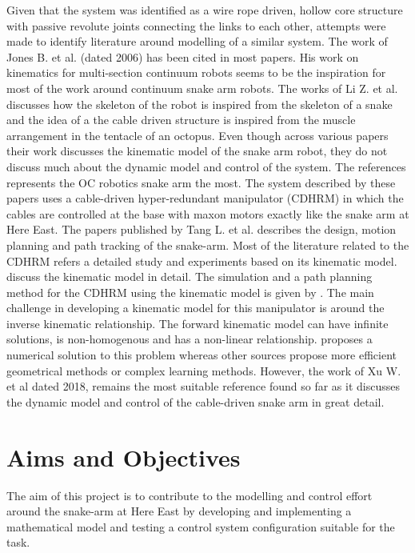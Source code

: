 \documentclass[a4paper,12pt]{report}
\begin{document}
Given that the system was identified as a wire rope driven, hollow core structure with passive revolute joints connecting the links to each other, attempts were made to identify literature around modelling of a similar system. The work of Jones B. et al. \cite{RN2} (dated 2006) has been cited in most papers. His work on kinematics for multi-section continuum robots seems to be the inspiration for most of the work around continuum snake arm robots. The works of Li Z. et al. \cite{RN8,RN7,RN15,RN21} discusses how the skeleton of the robot is inspired from the skeleton of a snake and the idea of a the cable driven structure is inspired from the muscle arrangement in the tentacle of an octopus. Even though across various papers their work discusses the kinematic model of the snake arm robot, they do not discuss much about the dynamic model and control of the system. The references \cite{RN35,RN31,RN29,RN30} represents the OC robotics snake arm the most. The system described by these papers uses a cable-driven hyper-redundant manipulator (CDHRM) in which the cables are controlled at the base with maxon motors exactly like the snake arm at Here East. The papers published by Tang L. et al. \cite{RN35,RN31} describes the design, motion planning and path tracking of the snake-arm.  Most of the literature related to the CDHRM refers a detailed study and experiments based on its kinematic model. \cite{RN29,RN31} discuss the kinematic model in detail. The simulation and a path planning method for the CDHRM using the kinematic model is given by \cite{RN35}. The main challenge in developing a kinematic model for this manipulator is around the inverse kinematic relationship. The forward kinematic model can have infinite solutions, is non-homogenous and has a non-linear relationship. \cite{RN2} proposes a numerical solution to this problem whereas other sources propose more efficient geometrical methods \cite{chirikjian1994modal} or complex learning methods\cite{giorelli2013feed}. However, the work of Xu W. et al \cite{RN30} dated 2018, remains the most suitable reference found so far as it discusses the dynamic model and control of the cable-driven snake arm in great detail. 

\section{Aims and Objectives}
\label{objectives}
The aim of this project is to contribute to the modelling and control effort around the snake-arm at Here East by developing and implementing a mathematical model and testing a control system configuration suitable for the task.
\end{document}
